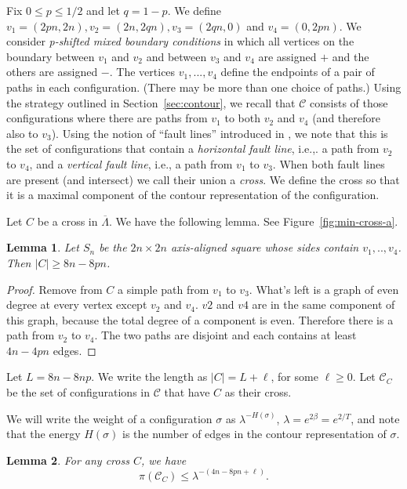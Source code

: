 \documentclass[letterpaper,english,numberwithinsect]{amsart}
\newtheorem{lemma}{Lemma}[section]
\newcommand{\cC}{\mathcal{C}}
\begin{document}
Fix $0\leq p \leq 1/2$ and let $q=1-p$.  We define $v_1=(2pn, 2n), v_2=(2n,2qn), v_3=(2qn,0)$ and $v_4=(0,2pn)$.  We consider {\it p-shifted mixed boundary conditions} in which all vertices on the boundary between $v_1$ and $v_2$ and between $v_3$ and $v_4$ are assigned $+$ and the others are assigned $-$.  
The vertices $v_1,...,v_4$ define the endpoints of a pair of paths in each configuration.  
(There may be more than one choice of paths.) 
Using the strategy outlined in Section~\ref{sec:contour}, we recall that $\cC$ consists of those configurations where there are paths from $v_1$ to both $v_2$ and $v_4$ (and therefore also to $v_3$).  Using the notion of 	``fault lines'' introduced in \cite{randall-top}, we note that this is the set of configurations that contain a {\it horizontal fault line}, i.e.,. a path from $v_2$ to $v_4$, and a {\it vertical fault line}, i.e., a path from $v_1$ to $v_3$.  When both fault lines are present (and intersect) we call their union a {\it cross}.  We define the cross so that it is a maximal component of the contour representation of the configuration.

Let $C$ be a cross in $\overline{\Lambda}$.  We have the following lemma. See Figure~\ref{fig:min-cross-a}.

\begin{lemma}
\label{lem:min-cross}
Let $S_n$ be the $2n\times2n$ axis-aligned square whose sides contain $v_1,..,v_4$. 
Then $|C| \geq 8n-8pn$. 
\end{lemma}

\begin{proof}
Remove from $C$ a simple path from $v_1$ to $v_3$. What's left is a graph of even degree at every vertex except $v_2$ and $v_4$. $v2$ and $v4$ are in the same component of this graph, because the total degree of a component is even. Therefore there is a path from $v_2$ to $v_4$. The two paths are disjoint and each contains at least $4n - 4pn$ edges.
\end{proof}

Let $L = 8n-8np$. We write the length as $|C|=L + \ell$, for some $\ell \geq 0$.  Let $\cC_C $ be the set of configurations in $\cC$ that have $C$ as their cross. 

We will write the weight of a configuration $\sigma$ as $\lambda^{-H(\sigma)}$, $\lambda = e^{2\beta} = e^{2/T}$, and note that the energy $H(\sigma)$ is the number of edges in the contour representation of $\sigma$. 

\begin{lemma}\label{lem:cross} For any  cross $C$, we have
$$\pi(\cC_C ) \leq \lambda^{-(4n-8pn+\ell)}.$$
\end{lemma}
\end{document}
